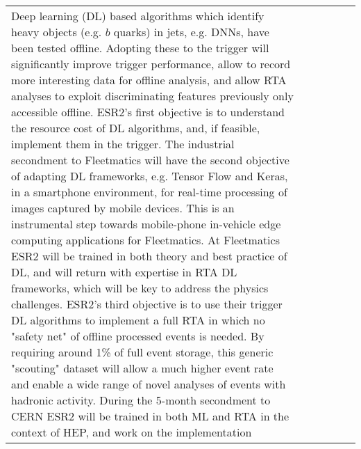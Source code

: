 \begin{center}
{\begin{tabular}{|p{19mm}|p{23mm}|p{25mm}|p{21mm}|p{23mm}|p{69mm}|}
{Deep learning (DL) based algorithms which identify heavy objects (e.g. $b$ quarks) in 
jets, e.g. DNNs, have been tested offline. 
Adopting these to the trigger will significantly improve
trigger performance, allow to record more
interesting data for offline analysis, and 
allow RTA analyses to exploit discriminating features previously only accessible offline. ESR2's first objective is to understand the
resource cost of DL algorithms, and, if feasible, implement them in the trigger. 
The industrial secondment to Fleetmatics will have the second objective of
adapting DL frameworks, e.g. Tensor Flow and Keras,
in a smartphone environment, for real-time processing of images captured by mobile devices. 
This is an instrumental step towards mobile-phone in-vehicle edge computing
applications for Fleetmatics.
At Fleetmatics ESR2 will be trained in both theory and best practice of DL, and will return with expertise in RTA DL frameworks, which will be key to address the physics challenges.
ESR2's third objective is to use their trigger DL algorithms 
to implement a full RTA in which no "safety net" of offline processed events
is needed. By requiring around 1\% of full event storage, this generic "scouting" dataset will allow a much higher event rate and enable a wide range of novel analyses of events with hadronic activity.
During the 5-month secondment to CERN ESR2 will be trained in both ML and RTA in the context of HEP, and work on the implementation 
}
\end{tabular}}
\end{center}
